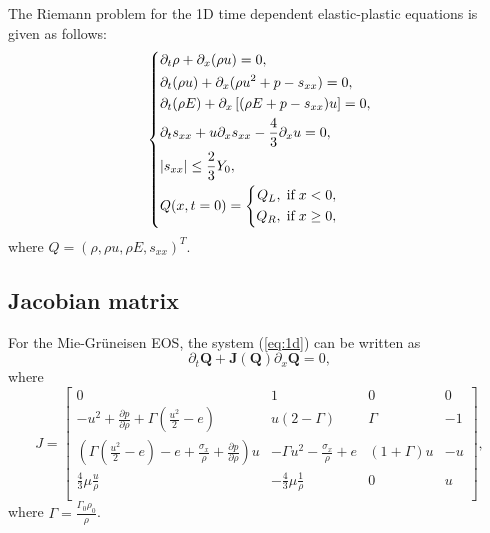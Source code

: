 \documentclass{article}
\numberwithin{equation}{section}
\numberwithin{table}{section}
\begin{document}
The Riemann problem for the 1D time dependent elastic-plastic equations is given as follows:
 \begin{equation}\label{eq:1d}
   \left\{ \begin{aligned}
	   & \partial _t \rho +\partial_x(\rho u)=0,\\
	   & \partial _t (\rho u)+\partial_x(\rho u^2 + p -s_{xx})=0,\\
	   &\partial _t (\rho E)+\partial_x\left[(\rho E + p -s_{xx})u\right]=0,\\
	   &\partial _t s_{xx}+u\partial_xs_{xx}-\frac{4}{3}\partial_x u=0,\\
& |s_{xx}|\leq \frac{2}{3}Y_{0}, \\
	   &Q(x,t = 0) = \left\{\begin{aligned}
		   Q_L, \hspace{0.1cm} \text{if} \hspace{0.1cm} x<0, \\
		   Q_R, \hspace{0.1cm} \text{if} \hspace{0.1cm} x\ge 0, \\
	   \end{aligned}\right.
	 \end{aligned}
  \right.
\end{equation}
where $Q = (\rho, \rho u, \rho E, s_{xx})^T$.

\subsection{Jacobian matrix} %
For the Mie-Gr\"uneisen EOS, the system (\ref{eq:1d}) can be written as
\begin{equation}
  \partial _t \bm{Q} +\bm{J}(\bm{Q})\partial_x\bm{Q} = 0,
\end{equation}
where
\begin{equation}\label{eq:Jcb}
  J = \left[\begin{array}{llll}
	  0 & 1 & 0 & 0 \\
	  -u^2 + \frac{\partial p}{\partial \rho} +\Gamma(\frac{u^2}{2}-e)& u(2-\Gamma)& \Gamma & -1 \\
	  (\Gamma(\frac{u^2}{2}-e)-e+\frac{\sigma_x}{\rho}+\frac{\partial p}{\partial \rho})u & -\Gamma u^2 -\frac{\sigma_x}{\rho} +e & (1+\Gamma)u& -u\\
	\frac{4}{3}\mu\frac{u}{\rho} & -\frac{4}{3}\mu\frac{1}{\rho}& 0 & u \\
\end{array}
\right],
\end{equation}
where $\Gamma = \frac{\Gamma_0\rho_0}{\rho} $.
\end{document}
